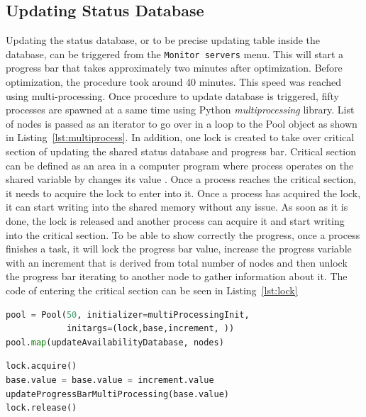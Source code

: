 {{{{\subsection{Updating Status Database}
Updating the status database, or to be precise updating table inside the database, can be triggered from the \texttt{Monitor servers} menu. This will start a progress bar that takes approximately two minutes after optimization. Before optimization, the procedure took around 40 minutes. This speed was reached using multi-processing. Once procedure to update database is triggered, fifty processes are spawned at a same time using Python \textit{multiprocessing} library. List of nodes is passed as an iterator to go over in a loop to the Pool object as shown in Listing~\ref{lst:multiprocess}. In addition, one lock is created to take over critical section of updating the shared status database and progress bar. Critical section can be defined as an area in a computer program where process operates on the shared variable by changes its value \cite{gebali2011algorithms}. Once a process reaches the critical section, it needs to acquire the lock to enter into it. Once a process has acquired the lock, it can start writing into the shared memory without any issue. As soon as it is done, the lock is released and another process can acquire it and start writing into the critical section. To be able to show correctly the progress, once a process finishes a task, it will lock the progress bar value, increase the progress variable with an increment that is derived from total number of nodes and then unlock the progress bar iterating to another node to gather information about it. The code of entering the critical section can be seen in  Listing~\ref{lst:lock}\\
 
{\noindent\begin{minipage}{\linewidth}
		\begin{lstlisting}[language=Python, numbers=none, label={lst:multiprocess}, caption=Creating a multi-processing object with fifty processes\, three shared variables and list of nodes as iterator., frame=single, showstringspaces=false, breaklines=true]
pool = Pool(50, initializer=multiProcessingInit,
			initargs=(lock,base,increment, ))
pool.map(updateAvailabilityDatabase, nodes)
		\end{lstlisting}
	\end{minipage} 

{\noindent\begin{minipage}{\linewidth}
		\begin{lstlisting}[language=Python, numbers=none, label={lst:lock}, caption=Entering a critical section and acquiring a lock., frame=single, showstringspaces=false, breaklines=true]
lock.acquire()
base.value = base.value = increment.value
updateProgressBarMultiProcessing(base.value)
lock.release()
		\end{lstlisting}
	\end{minipage} 

}}}}}}
